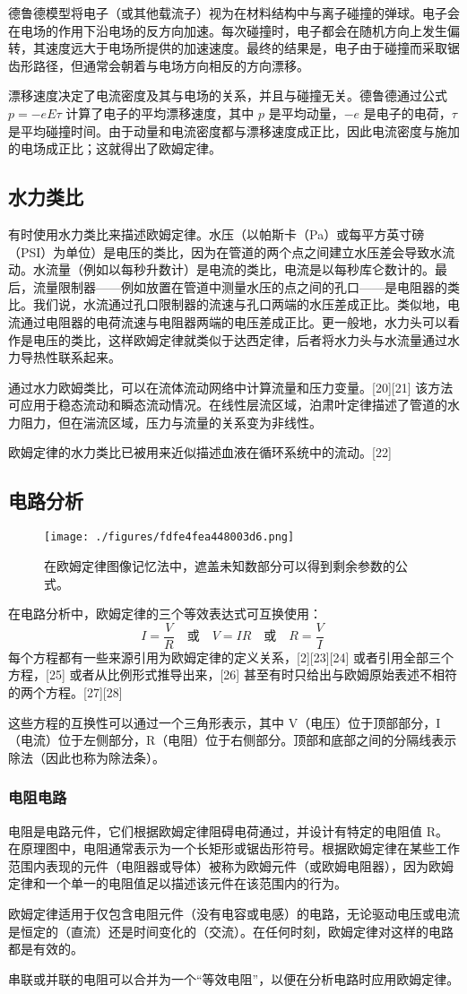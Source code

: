 德鲁德模型将电子（或其他载流子）视为在材料结构中与离子碰撞的弹球。电子会在电场的作用下沿电场的反方向加速。每次碰撞时，电子都会在随机方向上发生偏转，其速度远大于电场所提供的加速速度。最终的结果是，电子由于碰撞而采取锯齿形路径，但通常会朝着与电场方向相反的方向漂移。

漂移速度决定了电流密度及其与电场的关系，并且与碰撞无关。德鲁德通过公式 \( p = -eE\tau \) 计算了电子的平均漂移速度，其中 \( p \) 是平均动量，\( -e \) 是电子的电荷，\( \tau \) 是平均碰撞时间。由于动量和电流密度都与漂移速度成正比，因此电流密度与施加的电场成正比；这就得出了欧姆定律。
\subsection{水力类比}

有时使用水力类比来描述欧姆定律。水压（以帕斯卡（Pa）或每平方英寸磅（PSI）为单位）是电压的类比，因为在管道的两个点之间建立水压差会导致水流动。水流量（例如以每秒升数计）是电流的类比，电流是以每秒库仑数计的。最后，流量限制器——例如放置在管道中测量水压的点之间的孔口——是电阻器的类比。我们说，水流通过孔口限制器的流速与孔口两端的水压差成正比。类似地，电流通过电阻器的电荷流速与电阻器两端的电压差成正比。更一般地，水力头可以看作是电压的类比，这样欧姆定律就类似于达西定律，后者将水力头与水流量通过水力导热性联系起来。

通过水力欧姆类比，可以在流体流动网络中计算流量和压力变量。[20][21] 该方法可应用于稳态流动和瞬态流动情况。在线性层流区域，泊肃叶定律描述了管道的水力阻力，但在湍流区域，压力与流量的关系变为非线性。

欧姆定律的水力类比已被用来近似描述血液在循环系统中的流动。[22]
\subsection{电路分析}
\begin{figure}[ht]
\centering
\texttt{[image: ./figures/fdfe4fea448003d6.png]}
\caption{在欧姆定律图像记忆法中，遮盖未知数部分可以得到剩余参数的公式。} \label{fig_OuMu_6}
\end{figure}
在电路分析中，欧姆定律的三个等效表达式可互换使用：
\[
I = \frac{V}{R} \quad \text{或} \quad V = IR \quad \text{或} \quad R = \frac{V}{I}~
\]
每个方程都有一些来源引用为欧姆定律的定义关系，[2][23][24] 或者引用全部三个方程，[25] 或者从比例形式推导出来，[26] 甚至有时只给出与欧姆原始表述不相符的两个方程。[27][28]

这些方程的互换性可以通过一个三角形表示，其中 V（电压）位于顶部部分，I（电流）位于左侧部分，R（电阻）位于右侧部分。顶部和底部之间的分隔线表示除法（因此也称为除法条）。
\subsubsection{电阻电路}
电阻是电路元件，它们根据欧姆定律阻碍电荷通过，并设计有特定的电阻值 R。在原理图中，电阻通常表示为一个长矩形或锯齿形符号。根据欧姆定律在某些工作范围内表现的元件（电阻器或导体）被称为欧姆元件（或欧姆电阻器），因为欧姆定律和一个单一的电阻值足以描述该元件在该范围内的行为。

欧姆定律适用于仅包含电阻元件（没有电容或电感）的电路，无论驱动电压或电流是恒定的（直流）还是时间变化的（交流）。在任何时刻，欧姆定律对这样的电路都是有效的。

串联或并联的电阻可以合并为一个“等效电阻”，以便在分析电路时应用欧姆定律。